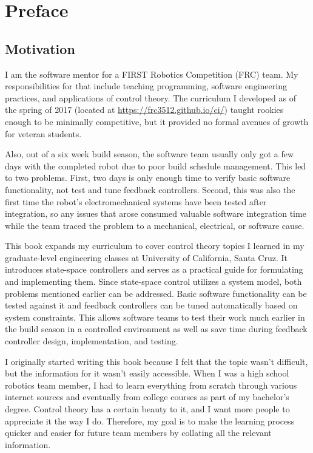 
\chapter{Preface}

\section*{Motivation}

I am the software mentor for a FIRST Robotics Competition (FRC) team. My
responsibilities for that include teaching programming, software engineering
practices, and applications of control theory. The curriculum I developed as of
the spring of 2017 (located at \url{https://frc3512.github.io/ci/}) taught
rookies enough to be minimally competitive, but it provided no formal avenues of
growth for veteran students.

Also, out of a six week build season, the software team usually only got a few
days with the completed robot due to poor build schedule management. This led to
two problems. First, two days is only enough time to verify basic software
functionality, not test and tune feedback controllers. Second, this was also the
first time the robot's electromechanical systems have been tested after
integration, so any issues that arose consumed valuable software integration
time while the team traced the problem to a mechanical, electrical, or software
cause.

This book expands my curriculum to cover control theory topics I learned in my
graduate-level engineering classes at University of California, Santa Cruz. It
introduces state-space controllers and serves as a practical guide for
formulating and implementing them. Since state-space control utilizes a system
model, both problems mentioned earlier can be addressed. Basic software
functionality can be tested against it and feedback controllers can be tuned
automatically based on system constraints. This allows software teams to test
their work much earlier in the build season in a controlled environment as well
as save time during feedback controller design, implementation, and testing.

I originally started writing this book because I felt that the topic wasn't
difficult, but the information for it wasn't easily accessible. When I was a
high school robotics team member, I had to learn everything from scratch through
various internet sources and eventually from college courses as part of my
bachelor's degree. Control theory has a certain beauty to it, and I want more
people to appreciate it the way I do. Therefore, my goal is to make the learning
process quicker and easier for future team members by collating all the relevant
information.

